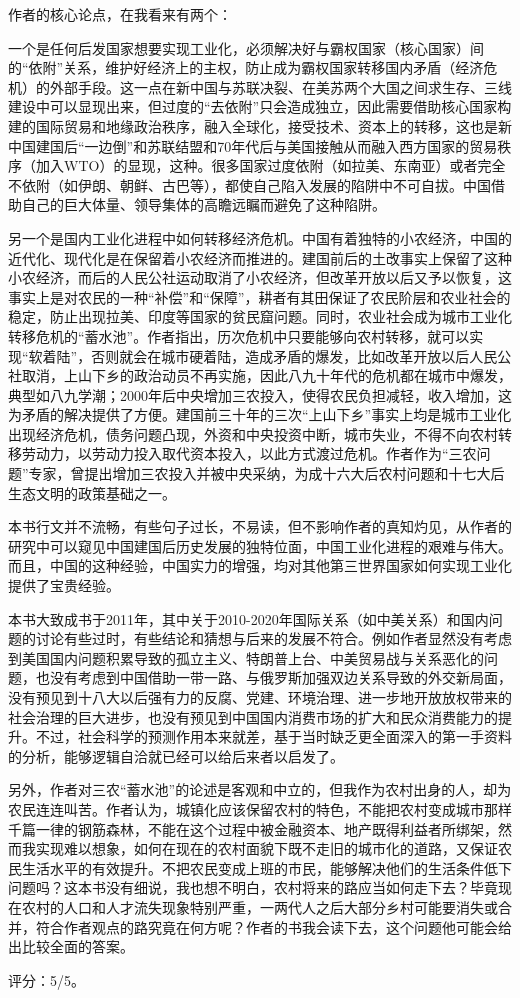 作者的核心论点，在我看来有两个：
\begin{itemize*}
    \item 一个是任何后发国家想要实现工业化，必须解决好与霸权国家（核心国家）间的“依附”关系，维护好经济上的主权，防止成为霸权国家转移国内矛盾（经济危机）的外部手段。这一点在新中国与苏联决裂、在美苏两个大国之间求生存、三线建设中可以显现出来，但过度的“去依附”只会造成独立，因此需要借助核心国家构建的国际贸易和地缘政治秩序，融入全球化，接受技术、资本上的转移，这也是新中国建国后“一边倒”和苏联结盟和70年代后与美国接触从而融入西方国家的贸易秩序（加入WTO）的显现，这种。很多国家过度依附（如拉美、东南亚）或者完全不依附（如伊朗、朝鲜、古巴等），都使自己陷入发展的陷阱中不可自拔。中国借助自己的巨大体量、领导集体的高瞻远瞩而避免了这种陷阱。
    \item 另一个是国内工业化进程中如何转移经济危机。中国有着独特的小农经济，中国的近代化、现代化是在保留着小农经济而推进的。建国前后的土改事实上保留了这种小农经济，而后的人民公社运动取消了小农经济，但改革开放以后又予以恢复，这事实上是对农民的一种“补偿”和“保障”，耕者有其田保证了农民阶层和农业社会的稳定，防止出现拉美、印度等国家的贫民窟问题。同时，农业社会成为城市工业化转移危机的“蓄水池”。作者指出，历次危机中只要能够向农村转移，就可以实现“软着陆”，否则就会在城市硬着陆，造成矛盾的爆发，比如改革开放以后人民公社取消，上山下乡的政治动员不再实施，因此八九十年代的危机都在城市中爆发，典型如八九学潮；2000年后中央增加三农投入，使得农民负担减轻，收入增加，这为矛盾的解决提供了方便。建国前三十年的三次“上山下乡”事实上均是城市工业化出现经济危机，债务问题凸现，外资和中央投资中断，城市失业，不得不向农村转移劳动力，以劳动力投入取代资本投入，以此方式渡过危机。作者作为“三农问题”专家，曾提出增加三农投入并被中央采纳，为成十六大后农村问题和十七大后生态文明的政策基础之一。
\end{itemize*}

本书行文并不流畅，有些句子过长，不易读，但不影响作者的真知灼见，从作者的研究中可以窥见中国建国后历史发展的独特位面，中国工业化进程的艰难与伟大。而且，中国的这种经验，中国实力的增强，均对其他第三世界国家如何实现工业化提供了宝贵经验。

本书大致成书于2011年，其中关于2010-2020年国际关系（如中美关系）和国内问题的讨论有些过时，有些结论和猜想与后来的发展不符合。例如作者显然没有考虑到美国国内问题积累导致的孤立主义、特朗普上台、中美贸易战与关系恶化的问题，也没有考虑到中国借助一带一路、与俄罗斯加强双边关系导致的外交新局面，没有预见到十八大以后强有力的反腐、党建、环境治理、进一步地开放放权带来的社会治理的巨大进步，也没有预见到中国国内消费市场的扩大和民众消费能力的提升。不过，社会科学的预测作用本来就差，基于当时缺乏更全面深入的第一手资料的分析，能够逻辑自洽就已经可以给后来者以启发了。

另外，作者对三农“蓄水池”的论述是客观和中立的，但我作为农村出身的人，却为农民连连叫苦。作者认为，城镇化应该保留农村的特色，不能把农村变成城市那样千篇一律的钢筋森林，不能在这个过程中被金融资本、地产既得利益者所绑架，然而我实现难以想象，如何在现在的农村面貌下既不走旧的城市化的道路，又保证农民生活水平的有效提升。不把农民变成上班的市民，能够解决他们的生活条件低下问题吗？这本书没有细说，我也想不明白，农村将来的路应当如何走下去？毕竟现在农村的人口和人才流失现象特别严重，一两代人之后大部分乡村可能要消失或合并，符合作者观点的路究竟在何方呢？作者的书我会读下去，这个问题他可能会给出比较全面的答案。

评分：5/5。
